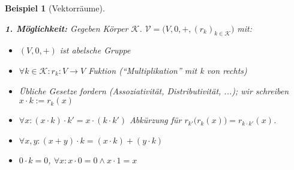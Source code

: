 \documentclass{article}
\theoremstyle{definition}
\theoremstyle{plain}
\newtheorem*{bsp}{Beispiel}
\newcommand{\m}[1]{\mathcal{#1}}
\begin{document}
    \begin{bsp}[Vektorräume]
        ~\par
        \textbf{1. Möglichkeit:}
        Gegeben Körper $ \m{K} $.
        $ \m{V} = \big(V, 0, +, (r_k)_{k \in \m{K}} \big) $ mit:
        \begin{itemize}
            \item $ (V, 0, +) $ ist abelsche Gruppe
            \item $ \forall k \in \m{K}: r_k : V \rightarrow V $ Fuktion (``Multiplikation'' mit k von rechts)
            \item Übliche Gesetze fordern (Assoziativität, Distributivität, ...); wir schreiben $ x \cdot k := r_k(x) $
            \item $ \forall x: (x \cdot k) \cdot k' = x \cdot (k \cdot k') $ Abkürzung für $ r_{k'}\big(r_k(x)\big) = r_{k \cdot k'}(x) $.
            \item $ \forall x, y: (x + y ) \cdot k = (x \cdot k) + (y \cdot k) $
            \item $ 0 \cdot k = 0 $, $ \forall x: x \cdot 0 = 0 \land x \cdot 1 = x $
        \end{itemize}

    \end{bsp}
\end{document}
